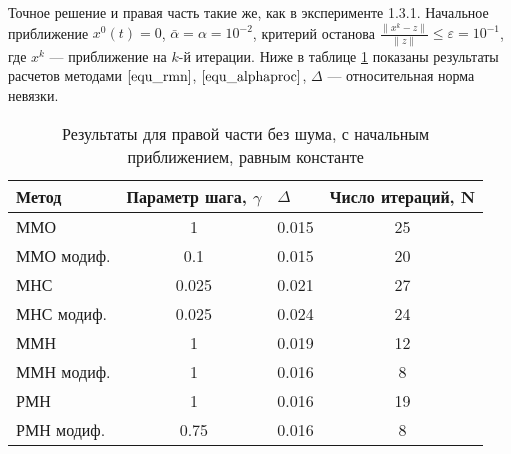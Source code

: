 Точное решение и правая часть такие же, как в эксперименте 1.3.1.  Начальное приближение $x^0(t)=0$, $\bar\alpha=\alpha=10^{-2}$, критерий останова $\frac{\|x^k-z\|}{\|z\|}\le\varepsilon=10^{-1}$, где $x^k$ --- приближение на $k$-й итерации. %
Ниже в таблице \ref{table1.2} показаны результаты расчетов методами $\eqref{equ_rmn}$, $\eqref{equ_alphaproc}$, $\Delta$ --- относительная норма невязки. 
\begin{table}[h]
	\centering
	\renewcommand{\arraystretch}{1.5}
	\caption{Результаты для правой части без шума, с начальным приближением, равным константе}
	\label{table1.2}
	\begin{tabular}{|l|c|c|c|}
		\hline
		\textbf{Метод}                   & \multicolumn{1}{l|}{\textbf{Параметр шага, $\gamma$}} & \multicolumn{1}{l|}{\textbf{$\Delta$}} & \multicolumn{1}{l|}{\textbf{Число итераций, N}} \\ \hline
		ММО                              & 1                                                     & 0.015                                  & 25                                              \\ \hline
		\multicolumn{1}{|r|}{ММО модиф.} & 0.1                                                   & 0.015                                  & 20                                              \\ \hline
		МНС                              & 0.025                                                 & 0.021                                  & 27                                              \\ \hline
		МНС модиф.                       & 0.025                                                 & 0.024                                  & 24                                              \\ \hline
		ММН                              & 1                                                     & 0.019                                  & 12                                              \\ \hline
		ММН модиф.                       & 1                                                     & 0.016                                  & 8                                               \\ \hline
		РМН                              & 1                                                     & 0.016                                  & 19                                              \\ \hline
		РМН модиф.                       & 0.75                                                  & 0.016                                  & 8                                               \\ \hline
	\end{tabular}
\end{table}

